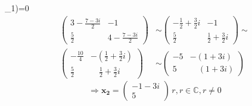 \begin{mathexam}
  \lambda_1)=0 \Rightarrow\)
  \begin{align*}
    \begin{pmatrix}
      3  - \frac{7-3i}{2}       &  -1                                     \\
      \frac{5}{2}               &  4 - \frac{7-3i}{2}
    \end{pmatrix}
    &\sim
    \begin{pmatrix}
      -\frac{1}{2}+\frac{3}{2}i  &  -1                                     \\
      \frac{5}{2}                & \frac{1}{2}+\frac{3}{2}i
    \end{pmatrix}                                 
    \sim                                                                          \\
    \begin{pmatrix}
      -\frac{10}{4}              &-\left(\frac{1}{2} +\frac{3}{2}i\right)  \\
      \frac{5}{2}                & \quad\frac{1}{2}+\frac{3}{2}i
    \end{pmatrix}
    &\sim                                                                   
    \begin{pmatrix}
      -5                         &-\left(1+3i\right)                       \\
      5                          & \quad\left(1+3i\right)
    \end{pmatrix}
  \end{align*} 
  \begin{equation*} 
    \Rightarrow \mathbf{x_2}=
    \begin{pmatrix}
      -1-3i \\ 5
    \end{pmatrix}
    \, r, r\in\mathbb{C}, r\neq0
  \end{equation*}
  
\end{mathexam}